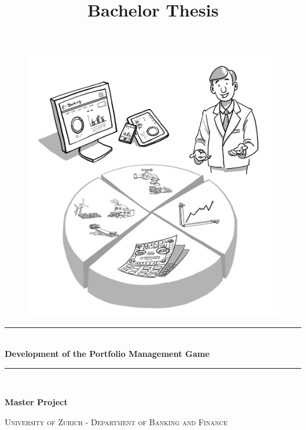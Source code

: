 \documentclass[a4paper,twoside, openright]{report}
\title{Bachelor Thesis}
\newcommand{\HRule}{\rule{\linewidth}{0.3mm}} %
\begin{document}
\begin{titlepage}
\begingroup
\centering
\vspace*{\baselineskip}

\thispagestyle{empty}

\begin{figure}[H]
	\centering
	\begin{minipage}{.49\textwidth}
		\centering
		\includegraphics[scale=0.4]{img/InvestmentSolutions.jpg}
	\end{minipage}
\end{figure}

\vspace*{1\baselineskip}

\HRule \\[0.4cm]
{\LARGE \textbf{Development of the Portfolio Management Game}}
\HRule \\[1.5cm]

\vspace*{1\baselineskip}

{\large \textbf{Master Project}}

\vspace*{1\baselineskip}

\scshape %
\large University of Zurich - Department of Banking and Finance \\ \vspace{3.5mm}


\end{titlepage}
\end{document}

